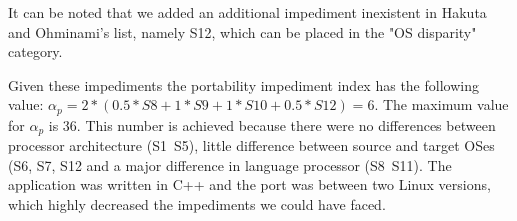 It can be noted that we added an additional impediment inexistent in Hakuta and
Ohminami's list, namely S12, which can be placed in the "OS disparity" category.

Given these impediments the portability impediment index has the following
value: $\alpha_p = 2 * (0.5 * S8 + 1 * S9 + 1 * S10 + 0.5 * S12) = 6$. The
maximum value for $\alpha_p$ is 36. This number is achieved because there were
no differences between processor architecture (S1~S5), little difference between
source and target OSes (S6, S7, S12 and a major difference in language processor
(S8~S11). The application was written in C++ and the port was between two Linux
versions, which highly decreased the impediments we could have faced.
